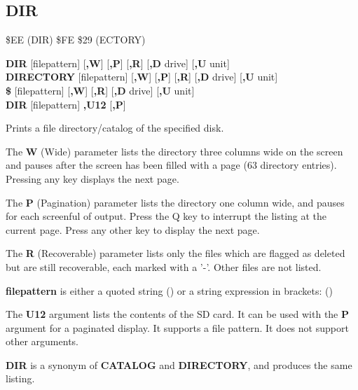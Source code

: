 
\newpage
\subsection{DIR}
\begin{description}[leftmargin=2cm,style=nextline]
\item [Token:]    \$EE (DIR) \$FE \$29 (ECTORY)

\item [Format:]   {\bf DIR} [filepattern] [{\bf,W}] [{\bf,P}] [{\bf,R}] [{\bf,D} drive] [{\bf,U} unit] \\
		            {\bf DIRECTORY} [filepattern] [{\bf,W}] [{\bf,P}] [{\bf,R}] [{\bf,D} drive] [{\bf,U} unit] \\
		            {\bf \$} [filepattern] [{\bf,W}] [{\bf,R}] [{\bf,D} drive] [{\bf,U} unit] \\
                  {\bf DIR} [filepattern] {\bf,U12} [{\bf,P}]

\item [Usage:]    Prints a file directory/catalog of the specified disk.

                  The {\bf W} (Wide) parameter lists the directory three columns wide on the screen and pauses after the screen has been filled with a page (63 directory entries). Pressing any key displays the next page.

                  The {\bf P} (Pagination) parameter lists the directory one column wide, and pauses for each screenful of output. Press the Q key to interrupt the listing at the current page. Press any other key to display the next page.

                  The {\bf R} (Recoverable) parameter lists only the files which are flagged as deleted but are still recoverable, each marked with a '-'. Other files are not listed.

                  {\bf filepattern} is either a quoted string () or a string expression in brackets: ()

                  The {\bf U12} argument lists the contents of the SD card. It can be used with the {\bf P} argument for a paginated display. It supports a file pattern. It does not support other arguments.

                  \drivedefinition

                  \unitdefinition

\item [Remarks:]  {\bf DIR} is a synonym of {\bf CATALOG} and {\bf DIRECTORY}, and produces the same listing.


\end{description}

